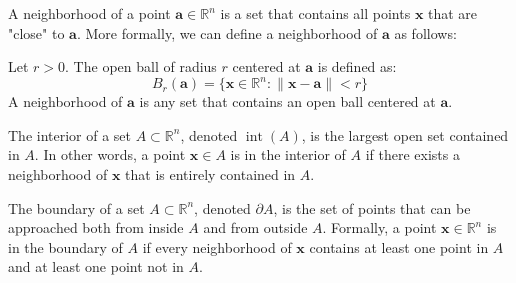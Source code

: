 \begin{definition}
A neighborhood of a point $\mathbf{a} \in \mathbb{R}^n$ is a set that contains all points $\mathbf{x}$ that are "close" to $\mathbf{a}$. More formally, we can define a neighborhood of $\mathbf{a}$ as follows:

Let $r > 0$. The open ball of radius $r$ centered at $\mathbf{a}$ is defined as:
\[
B_r(\mathbf{a}) = \{ \mathbf{x} \in \mathbb{R}^n : \|\mathbf{x} - \mathbf{a}\| < r \}
\]
A neighborhood of $\mathbf{a}$ is any set that contains an open ball centered at $\mathbf{a}$.
\end{definition}

\begin{definition}
The interior of a set $A \subset \mathbb{R}^n$, denoted $\operatorname{int}(A)$, is the largest open set contained in $A$. In other words, a point $\mathbf{x} \in A$ is in the interior of $A$ if there exists a neighborhood of $\mathbf{x}$ that is entirely contained in $A$.
\end{definition}

\begin{definition}
The boundary of a set $A \subset \mathbb{R}^n$, denoted $\partial A$, is the set of points that can be approached both from inside $A$ and from outside $A$. Formally, a point $\mathbf{x} \in \mathbb{R}^n$ is in the boundary of $A$ if every neighborhood of $\mathbf{x}$ contains at least one point in $A$ and at least one point not in $A$.
\end{definition}